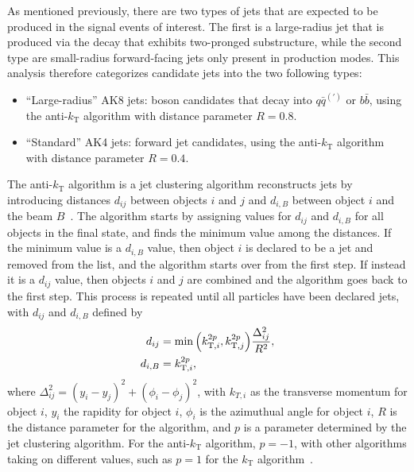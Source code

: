 As mentioned previously, there are two types of jets that are expected to be produced in the signal events of interest.
The first is a large-radius jet that is produced via the \VorH decay that exhibits two-pronged substructure, while the second type are small-radius forward-facing jets only present in \VBF production modes.
This analysis therefore categorizes candidate jets into the two following types:
\begin{itemize}
  \item ``Large-radius'' AK8 jets: \VorH boson candidates that decay into $q\bar{q}^{(\prime)}$ or $b\bar{b}$, using the anti-$k_\mathrm{T}$ algorithm with distance parameter $R=0.8$.
  \item ``Standard'' AK4 jets: \VBF forward jet candidates, using the anti-$k_\mathrm{T}$ algorithm with distance parameter $R=0.4$.
\end{itemize}

The anti-$k_\mathrm{T}$ algorithm is a jet clustering algorithm reconstructs jets by introducing distances $d_{ij}$ between objects $i$ and $j$ and $d_{i,B}$ between object $i$ and the beam $B$~\cite{Cacciari_2008}.
The algorithm starts by assigning values for $d_{ij}$ and $d_{i,B}$ for all objects in the final state, and finds the minimum value among the distances.
If the minimum value is a $d_{i,B}$ value, then object $i$ is declared to be a jet and removed from the list, and the algorithm starts over from the first step.
If instead it is a $d_{ij}$ value, then objects $i$ and $j$ are combined and the algorithm goes back to the first step.
This process is repeated until all particles have been declared jets, with $d_{ij}$ and $d_{i,B}$ defined by
\begin{align}
  d_{ij} &= \min\pqty{k_{\mathrm{T},i}^{2p},k_{\mathrm{T},j}^{2p}}\frac{\Delta_{ij}^2}{R^2},\\
  d_{i,B} &= k_{\mathrm{T},i}^{2p},
\end{align}
where $\Delta_{ij}^2=(y_i-y_j)^2+(\phi_i-\phi_j)^2$, with $k_{T,i}$ as the transverse momentum for object $i$, $y_i$ the rapidity for object $i$, $\phi_i$ is the azimuthual angle for object $i$, $R$ is the distance parameter for the algorithm, and $p$ is a parameter determined by the jet clustering algorithm.
For the anti-$k_\mathrm{T}$ algorithm, $p=-1$, with other algorithms taking on different values, such as $p=1$ for the $k_\mathrm{T}$ algorithm~\cite{shelton2013tasi}.


